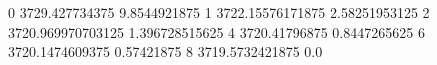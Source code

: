 0 3729.427734375 9.8544921875
1 3722.15576171875 2.58251953125
2 3720.969970703125 1.396728515625
4 3720.41796875 0.8447265625
6 3720.1474609375 0.57421875
8 3719.5732421875 0.0
